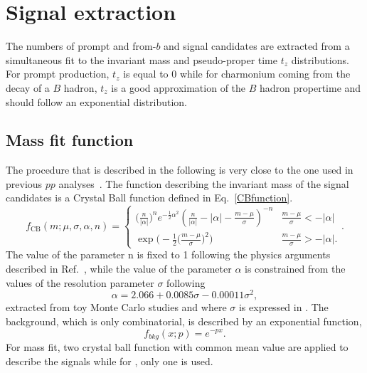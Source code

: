 \section{Signal extraction}
\label{Signal extraction}
The numbers of prompt and from-$b$ \jpsi and \psitwos signal candidates are extracted from a simultaneous fit to the invariant mass and pseudo-proper time $t_z$ distributions. For prompt production, $t_z$ is equal to 0 while for charmonium coming from the decay of a $B$ hadron, $t_z$ is a good approximation of the $B$ hadron propertime and should follow an exponential distribution.

\subsection{Mass fit function}
The procedure that is described in the following is very close to the one used in previous $pp$ analyses~\cite{LHCb:2015foc}. The function describing the invariant mass of the signal candidates is a Crystal Ball function defined in Eq.~\ref{CBfunction}.
\begin{equation}
 f_{\mathrm{CB}}(m;\mu,\sigma,\alpha,n) =
 \begin{cases}
      \Big(\frac{n}{|\alpha|}\Big)^n e^{-\frac{1}{2}\alpha^2} (\frac{n}{|\alpha|}-|\alpha|-\frac{m-\mu}{\sigma})^{-n} & \frac{m-\mu}{\sigma} < -|\alpha|\\
   \exp\Bigg( -\frac{1}{2}\Big(\frac{m-\mu}{\sigma}\Big)^2\Bigg) & \frac{m-\mu}{\sigma}>-|\alpha|.
\end{cases}.
\label{CBfunction}
\end{equation}
The value of the parameter n is fixed to 1 following the physics arguments described in Ref.~\cite{LefrancoisTalk}, while the value of the parameter $\alpha$ is constrained from the values of the resolution parameter $\sigma$ following
\begin{equation}
\alpha = 2.066+0.0085\sigma-0.00011\sigma^2,
\label{alphasigma}
\end{equation}
 extracted from toy Monte Carlo studies and where $\sigma$ is expressed in \mev. The background, which is only combinatorial, is described by an exponential function,
\begin{equation}
f_{bkg}(x;p)=e^{-px}.
\end{equation}
For \jpsi mass fit, two crystal ball function with common mean value are applied to describe the signals while for \psitwos, only one is used.
